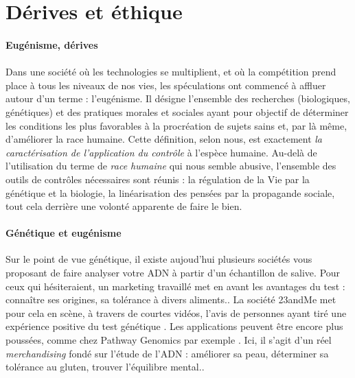 \section{Dérives et éthique}

\paragraph{Eugénisme, dérives}

\paragraph{} Dans une société où les technologies se multiplient, et où la compétition prend place
à tous les niveaux de nos vies, les spéculations ont commencé à affluer autour d'un terme : l'eugénisme.
Il désigne l'ensemble des recherches (biologiques, génétiques) et des pratiques morales et sociales
ayant pour objectif de \guillemotleft déterminer les conditions les plus favorables à la procréation
de sujets sains et, par là même, d'améliorer la race humaine\guillemotright  \cite{Eugenisme0}. Cette
définition, selon nous, est exactement \emph{la caractérisation de l'application du contrôle} à l'espèce
humaine. Au-delà de l'utilisation du terme de \emph{race humaine} qui nous semble abusive, l'ensemble des
outils de contrôles nécessaires sont réunis : la régulation de la Vie par la génétique et la biologie, la
linéarisation des pensées par la propagande sociale, tout cela derrière une volonté apparente de faire le bien.

\paragraph{Génétique et eugénisme} Sur le point de vue génétique, il existe aujoud'hui plusieurs sociétés
vous proposant de faire analyser votre ADN à partir d'un échantillon de salive. Pour ceux qui hésiteraient,
un marketing travaillé met en avant les avantages du test : connaître ses origines, sa tolérance à divers
aliments.. La société 23andMe met pour cela en scène, à travers de courtes vidéos, l'avis de personnes
ayant tiré une expérience positive du test génétique \cite{23andMe}. Les applications peuvent être 
encore plus poussées, comme chez Pathway Genomics par exemple \cite{Pathway0}. Ici, il s'agit d'un réel
\emph{merchandising} fondé sur l'étude de l'ADN : améliorer sa peau, déterminer sa tolérance au gluten, 
trouver l'équilibre mental..

